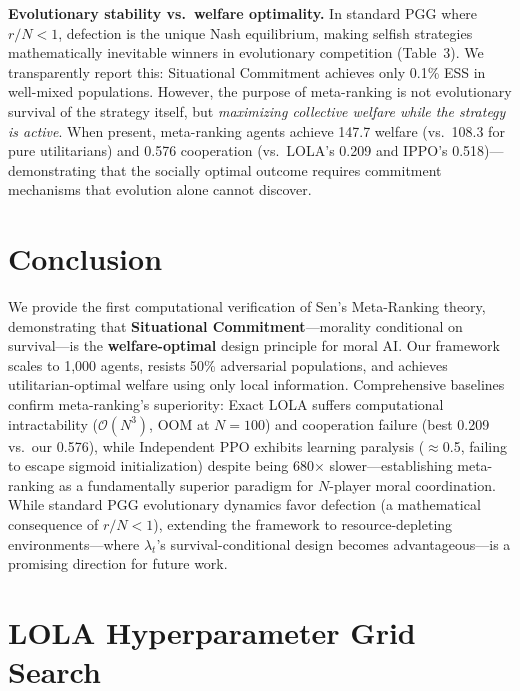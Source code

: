 \documentclass{article}
\begin{document}
\textbf{Evolutionary stability vs.\ welfare optimality.} In standard PGG where $r/N < 1$, defection is the unique Nash equilibrium, making selfish strategies mathematically inevitable winners in evolutionary competition (Table~3). We transparently report this: Situational Commitment achieves only 0.1\% ESS in well-mixed populations. However, the purpose of meta-ranking is not evolutionary survival of the strategy itself, but \textit{maximizing collective welfare while the strategy is active}. When present, meta-ranking agents achieve 147.7 welfare (vs.\ 108.3 for pure utilitarians) and 0.576 cooperation (vs.\ LOLA's 0.209 and IPPO's 0.518)---demonstrating that the socially optimal outcome requires commitment mechanisms that evolution alone cannot discover.

\section{Conclusion}

We provide the first computational verification of Sen's Meta-Ranking theory, demonstrating that \textbf{Situational Commitment}---morality conditional on survival---is the \textbf{welfare-optimal} design principle for moral AI. Our framework scales to 1,000 agents, resists 50\% adversarial populations, and achieves utilitarian-optimal welfare using only local information. Comprehensive baselines confirm meta-ranking's superiority: Exact LOLA suffers computational intractability ($\mathcal{O}(N^3)$, OOM at $N{=}100$) and cooperation failure (best 0.209 vs.\ our 0.576), while Independent PPO exhibits learning paralysis ($\approx$0.5, failing to escape sigmoid initialization) despite being 680$\times$ slower---establishing meta-ranking as a fundamentally superior paradigm for $N$-player moral coordination.
While standard PGG evolutionary dynamics favor defection (a mathematical consequence of $r/N < 1$), extending the framework to resource-depleting environments---where $\lambda_t$'s survival-conditional design becomes advantageous---is a promising direction for future work.




\appendix
\section{LOLA Hyperparameter Grid Search}
\label{app:heatmap}
\end{document}
